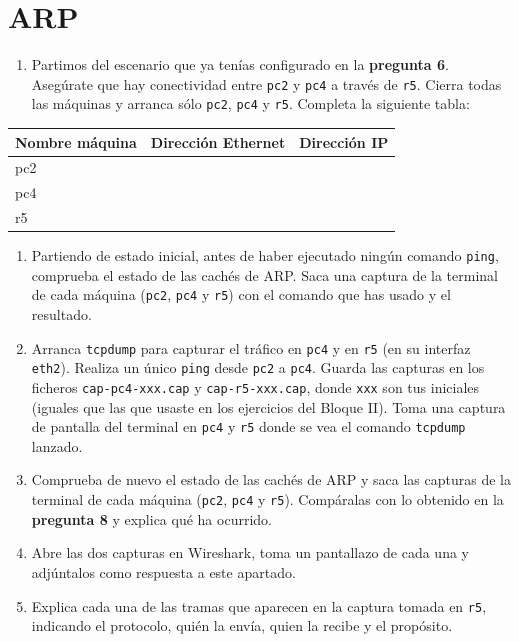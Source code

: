 \documentclass[a4paper]{article}
\begin{document}

\section{ARP}
\label{sec:arp}

\begin{enumerate}[resume]
	\item Partimos del escenario que ya tenías configurado en la \textbf{pregunta  6}. Asegúrate que 
	hay conectividad entre \texttt{pc2} y \texttt{pc4} a través de \texttt{r5}. Cierra todas las máquinas 
	y arranca sólo \texttt{pc2}, \texttt{pc4} y \texttt{r5}. Completa la siguiente tabla:
\end{enumerate}

	\bgroup
	\def\arraystretch{1.5}%
	\begin{tabular}{|l|p{5cm}|p{4cm}|}
		\hline 
		\textbf{Nombre máquina} & \textbf{Dirección Ethernet} & \textbf{Dirección IP} \\ 
		\hline 
		pc2 &  &   \\ 
		\hline 
		pc4 &  &  \\ 
		\hline 
		r5 &  &  \\ 
		\hline 
	\end{tabular} 
    \egroup
    \medskip
    
\begin{enumerate}[resume]
	\item Partiendo de estado inicial, antes de haber ejecutado ningún comando \texttt{ping}, 
	comprueba el estado de las cachés de ARP. Saca una captura de la terminal de cada máquina 
	(\texttt{pc2}, \texttt{pc4} y \texttt{r5}) con el comando que has usado y el resultado.
	
	\item Arranca \texttt{tcpdump} para capturar el tráfico en \texttt{pc4} y en \texttt{r5} (en su 
	interfaz \texttt{eth2}). Realiza un único \texttt{ping} desde \texttt{pc2} a \texttt{pc4}. Guarda 
	las capturas en los ficheros \texttt{cap-pc4-xxx.cap} y \texttt{cap-r5-xxx.cap}, donde \texttt{xxx}
	son tus iniciales (iguales que las que usaste en los ejercicios del Bloque II). Toma una captura 
	de pantalla del terminal en \texttt{pc4} y \texttt{r5} donde se vea el comando \texttt{tcpdump} 
	lanzado.
	
	\item Comprueba de nuevo el estado de las cachés de ARP y saca las capturas de la terminal 
	de cada máquina (\texttt{pc2}, \texttt{pc4} y \texttt{r5}). Compáralas con lo obtenido en la \textbf{pregunta 8} 
	y explica qué ha ocurrido.
	
	\item Abre las dos capturas en Wireshark, toma un pantallazo de cada una y adjúntalos como 
	respuesta a este apartado.
	
	\item Explica cada una de las tramas que aparecen en la captura tomada en \texttt{r5}, indicando 
	el protocolo, quién la envía, quien la recibe y el propósito.
\end{enumerate}
\end{document}
